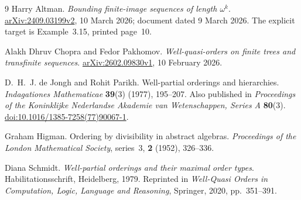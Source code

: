 \documentclass[11pt]{article}
\numberwithin{equation}{section}
\theoremstyle{plain}
\theoremstyle{definition}
\theoremstyle{remark}
\begin{document}
\begin{thebibliography}{9}
Harry Altman.
\emph{Bounding finite-image sequences of length $\omega^k$}.
\href{https://arxiv.org/abs/2409.03199v2}{arXiv:2409.03199v2},
10 March 2026; document dated 9 March 2026.
The explicit target is Example~3.15, printed page~10.

Alakh Dhruv Chopra and Fedor Pakhomov.
\emph{Well-quasi-orders on finite trees and transfinite sequences}.
\href{https://arxiv.org/abs/2602.09830v1}{arXiv:2602.09830v1},
10 February 2026.

D.~H.~J. de Jongh and Rohit Parikh.
Well-partial orderings and hierarchies.
\emph{Indagationes Mathematicae} \textbf{39}(3) (1977), 195--207.
Also published in \emph{Proceedings of the Koninklijke Nederlandse Akademie van Wetenschappen, Series A} \textbf{80}(3).
\href{https://doi.org/10.1016/1385-7258(77)90067-1}{doi:10.1016/1385-7258(77)90067-1}.

Graham Higman.
Ordering by divisibility in abstract algebras.
\emph{Proceedings of the London Mathematical Society}, series~3,
\textbf{2} (1952), 326--336.

Diana Schmidt.
\emph{Well-partial orderings and their maximal order types}.
Habilitationsschrift, Heidelberg, 1979.
Reprinted in \emph{Well-Quasi Orders in Computation, Logic, Language and Reasoning},
Springer, 2020, pp.~351--391.
\end{thebibliography}
\end{document}
